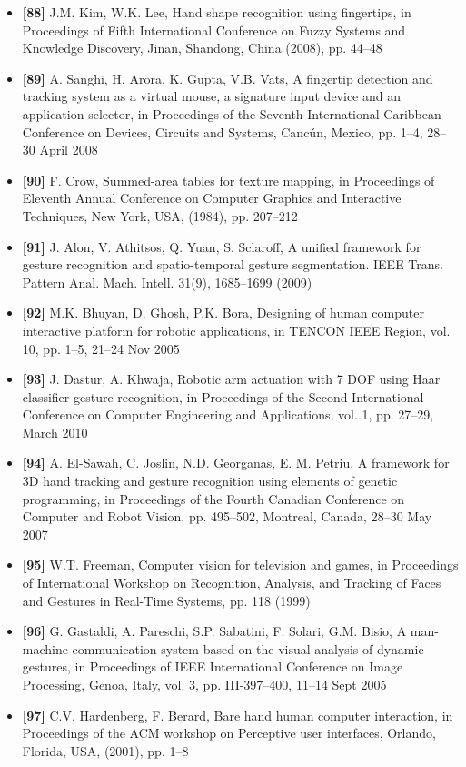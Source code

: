\documentclass[12pt, a4paper]{article}
\begin{document}
\begin{itemize}[label=]
    \item \textbf{[88]} J.M. Kim, W.K. Lee, Hand shape recognition using fingertips, in Proceedings of Fifth International Conference on Fuzzy Systems and Knowledge Discovery, Jinan, Shandong, China (2008), pp. 44–48
    \item \textbf{[89]} A. Sanghi, H. Arora, K. Gupta, V.B. Vats, A fingertip detection and tracking system as a virtual mouse, a signature input device and an application selector, in Proceedings of the Seventh International Caribbean Conference on Devices, Circuits and Systems, Cancún, Mexico, pp. 1–4, 28–30 April 2008
    \item \textbf{[90]} F. Crow, Summed-area tables for texture mapping, in Proceedings of Eleventh Annual Conference on Computer Graphics and Interactive Techniques, New York, USA, (1984), pp. 207–212
    \item \textbf{[91]} J. Alon, V. Athitsos, Q. Yuan, S. Sclaroff, A unified framework for gesture recognition and spatio-temporal gesture segmentation. IEEE Trans. Pattern Anal. Mach. Intell. 31(9), 1685–1699 (2009)
    \item \textbf{[92]} M.K. Bhuyan, D. Ghosh, P.K. Bora, Designing of human computer interactive platform for robotic applications, in TENCON IEEE Region, vol. 10, pp. 1–5, 21–24 Nov 2005
    \item \textbf{[93]} J. Dastur, A. Khwaja, Robotic arm actuation with 7 DOF using Haar classifier gesture recognition, in Proceedings of the Second International Conference on Computer Engineering and Applications, vol. 1, pp. 27–29, March 2010
    \item \textbf{[94]} A. El-Sawah, C. Joslin, N.D. Georganas, E. M. Petriu, A framework for 3D hand tracking and gesture recognition using elements of genetic programming, in Proceedings of the Fourth Canadian Conference on Computer and Robot Vision, pp. 495–502, Montreal, Canada, 28–30 May 2007
    \item \textbf{[95]} W.T. Freeman, Computer vision for television and games, in Proceedings of International Workshop on Recognition, Analysis, and Tracking of Faces and Gestures in Real-Time Systems, pp. 118 (1999)
    \item \textbf{[96]} G. Gastaldi, A. Pareschi, S.P. Sabatini, F. Solari, G.M. Bisio, A man-machine communication system based on the visual analysis of dynamic gestures, in Proceedings of IEEE International Conference on Image Processing, Genoa, Italy, vol. 3, pp. III-397–400, 11–14 Sept 2005
    \item \textbf{[97]} C.V. Hardenberg, F. Berard, Bare hand human computer interaction, in Proceedings of the ACM workshop on Perceptive user interfaces, Orlando, Florida, USA, (2001), pp. 1–8

\end{itemize}
\end{document}
